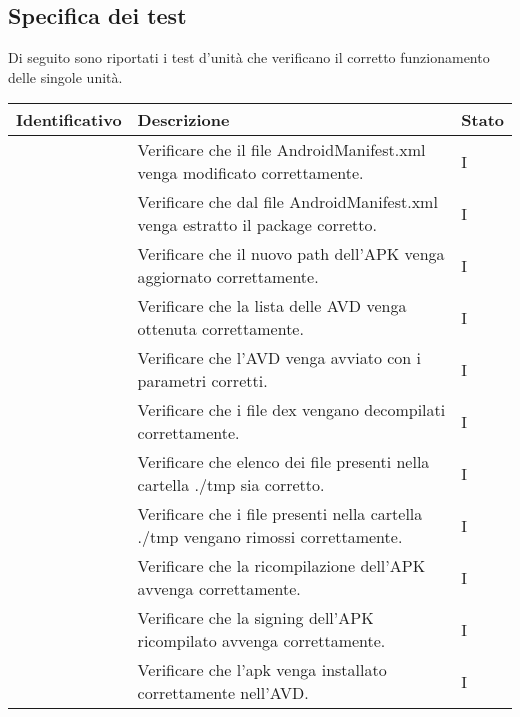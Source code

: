 \subsection{Specifica dei test}\label{subsec:specifica-dei-test-unitari}
Di seguito sono riportati i test d'unità che verificano il corretto funzionamento delle singole unità.
\begin{center}
    \begin{longtable}{ |C{3cm} | C{8.5cm}| C{1.5cm} |}
        \hline
        \textbf{Identificativo} &
        \textbf{Descrizione} &
        \textbf{Stato} \\\hline
         & Verificare che il file AndroidManifest.xml venga modificato correttamente.                              & I \\\hline
         & Verificare che dal file AndroidManifest.xml venga estratto il package corretto.                         & I \\\hline
         & Verificare che il nuovo path dell'APK venga aggiornato correttamente.                                   & I \\\hline
         & Verificare che la lista delle AVD venga ottenuta correttamente.                                         & I \\\hline
         & Verificare che l'AVD venga avviato con i parametri corretti.                                            & I \\\hline
         & Verificare che i file dex vengano decompilati correttamente.                                            & I \\\hline
         & Verificare che elenco dei file presenti nella cartella ./tmp sia corretto.                              & I \\\hline
         & Verificare che i file presenti nella cartella ./tmp vengano rimossi correttamente.                      & I \\\hline
         & Verificare che la ricompilazione dell'APK avvenga correttamente.                                        & I \\\hline
         & Verificare che la signing dell'APK ricompilato avvenga correttamente.                                   & I \\\hline
         & Verificare che l'apk venga installato correttamente nell'AVD.                                           & I \\\hline

\end{longtable}
\end{center}
